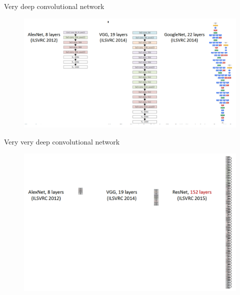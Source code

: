 \documentclass{beamer}
\begin{document}
\begin{frame}{Very deep convolutional network}

\begin{figure}[h!]
  \centering
  \includegraphics[width=1\textwidth]{images/comp1.png}
\end{figure}

\end{frame}


\begin{frame}{Very very deep convolutional network}

\begin{figure}[h!]
  \centering
  \includegraphics[width=1\textwidth]{images/comp2.png}
\end{figure}

\end{frame}
\end{document}
